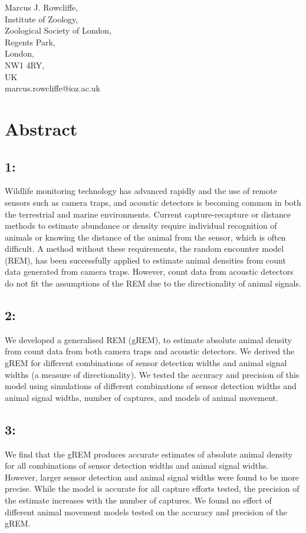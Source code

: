 \documentclass[a4paper,10pt,reqno,oneside]{amsart}
\begin{document}
Marcus J. Rowcliffe, \\
Institute of Zoology, \\
Zoological Society of London, \\
Regents Park, \\
London, \\
NW1 4RY, \\
UK \\
marcus.rowcliffe@ioz.ac.uk


\clearpage



\section{Abstract}
\subsection*{1:}  Wildlife monitoring technology has advanced rapidly and the use of remote sensors such as camera traps, and acoustic detectors is becoming common in both the terrestrial and marine environments. Current capture-recapture or distance methods to estimate abundance or density require individual recognition of animals or knowing the distance of the animal from the sensor, which is often difficult. A method without these requirements, the random encounter model (REM), has been successfully applied to estimate animal densities from count data generated from camera traps. However, count data from acoustic detectors do not fit the assumptions of the REM due to the directionality of animal signals.

\subsection*{2:} We developed a generalised REM (gREM), to estimate absolute animal density from count data from both camera traps and acoustic detectors. We derived the gREM for different combinations of sensor detection widths and animal signal widths (a measure of directionality). We tested the accuracy and precision of this model using simulations of different combinations of sensor detection widths and animal signal widths, number of captures, and models of animal movement. 

\subsection*{3:} We find that the gREM produces accurate estimates of absolute animal density for all combinations of sensor detection widths and animal signal widths. However, larger sensor detection and animal signal widths were found to be more precise. While the model is accurate for all capture efforts tested, the precision of the estimate increases with the number of captures. We found no effect of different animal movement models tested on the accuracy and precision of the gREM.  
\end{document}
